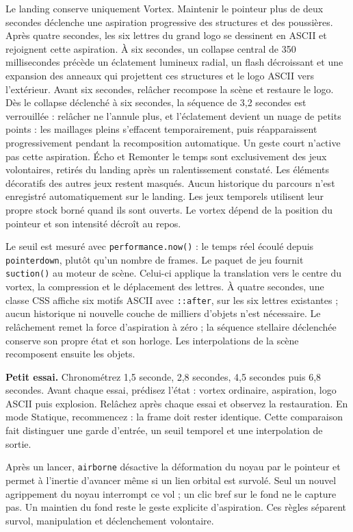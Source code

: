 \documentclass[
  canadien,
  11pt,
  letterpaper,
]{article}
\begin{document}
Le landing conserve uniquement Vortex. Maintenir le pointeur plus de
deux secondes déclenche une aspiration progressive des structures et des
poussières. Après quatre secondes, les six lettres du grand logo se
dessinent en ASCII et rejoignent cette aspiration. À six secondes, un
collapse central de 350 millisecondes précède un éclatement lumineux
radial, un flash décroissant et une expansion des anneaux qui projettent
ces structures et le logo ASCII vers l'extérieur. Avant six secondes,
relâcher recompose la scène et restaure le logo. Dès le collapse
déclenché à six secondes, la séquence de 3,2 secondes est verrouillée :
relâcher ne l'annule plus, et l'éclatement devient un nuage de petits
points : les maillages pleins s'effacent temporairement, puis
réapparaissent progressivement pendant la recomposition automatique. Un
geste court n'active pas cette aspiration. Écho et Remonter le temps
sont exclusivement des jeux volontaires, retirés du landing après un
ralentissement constaté. Les éléments décoratifs des autres jeux restent
masqués. Aucun historique du parcours n'est enregistré automatiquement
sur le landing. Les jeux temporels utilisent leur propre stock borné
quand ils sont ouverts. Le vortex dépend de la position du pointeur et
son intensité décroît au repos.

Le seuil est mesuré avec \texttt{performance.now()} : le temps réel
écoulé depuis \texttt{pointerdown}, plutôt qu'un nombre de frames. Le
paquet de jeu fournit \texttt{suction()} au moteur de scène. Celui-ci
applique la translation vers le centre du vortex, la compression et le
déplacement des lettres. À quatre secondes, une classe CSS affiche six
motifs ASCII avec \texttt{::after}, sur les six lettres existantes ;
aucun historique ni nouvelle couche de milliers d'objets n'est
nécessaire. Le relâchement remet la force d'aspiration à zéro ; la
séquence stellaire déclenchée conserve son propre état et son horloge.
Les interpolations de la scène recomposent ensuite les objets.

\textbf{Petit essai.} Chronométrez 1,5 seconde, 2,8 secondes, 4,5
secondes puis 6,8 secondes. Avant chaque essai, prédisez l'état : vortex
ordinaire, aspiration, logo ASCII puis explosion. Relâchez après chaque
essai et observez la restauration. En mode Statique, recommencez : la
frame doit rester identique. Cette comparaison fait distinguer une garde
d'entrée, un seuil temporel et une interpolation de sortie.

Après un lancer, \texttt{airborne} désactive la déformation du noyau par
le pointeur et permet à l'inertie d'avancer même si un lien orbital est
survolé. Seul un nouvel agrippement du noyau interrompt ce vol ; un clic
bref sur le fond ne le capture pas. Un maintien du fond reste le geste
explicite d'aspiration. Ces règles séparent survol, manipulation et
déclenchement volontaire.
\end{document}
